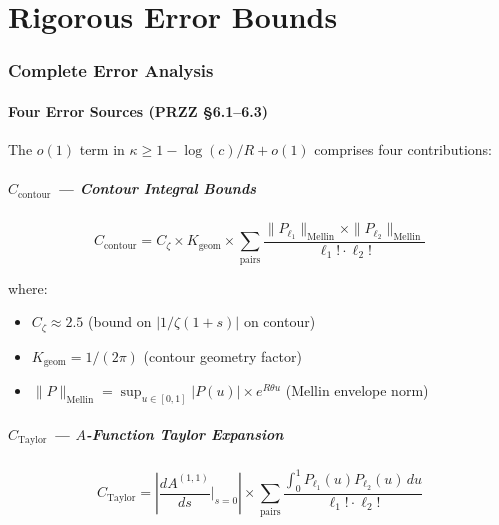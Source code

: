 \documentclass[11pt]{article}
\begin{document}

\part{Rigorous Error Bounds}

\section{Complete Error Analysis}
\label{sec:error}

\subsection{Four Error Sources (PRZZ \S6.1--6.3)}

The $o(1)$ term in $\kappa \geq 1 - \log(c)/R + o(1)$ comprises four contributions:

\subsubsection{$C_{\text{contour}}$ --- Contour Integral Bounds}

\begin{equation}
C_{\text{contour}} = C_\zeta \times K_{\text{geom}} \times \sum_{\text{pairs}} \frac{\|P_{\ell_1}\|_{\text{Mellin}} \times \|P_{\ell_2}\|_{\text{Mellin}}}{\ell_1! \cdot \ell_2!}
\end{equation}

where:
\begin{itemize}
\item $C_\zeta \approx 2.5$ (bound on $|1/\zeta(1+s)|$ on contour)
\item $K_{\text{geom}} = 1/(2\pi)$ (contour geometry factor)
\item $\|P\|_{\text{Mellin}} = \sup_{u \in [0,1]} |P(u)| \times e^{R\theta u}$ (Mellin envelope norm)
\end{itemize}

\subsubsection{$C_{\text{Taylor}}$ --- $A$-Function Taylor Expansion}

\begin{equation}
C_{\text{Taylor}} = \left|\frac{dA^{(1,1)}}{ds}\Big|_{s=0}\right| \times \sum_{\text{pairs}} \frac{\int_0^1 P_{\ell_1}(u) P_{\ell_2}(u) \, du}{\ell_1! \cdot \ell_2!}
\end{equation}
\end{document}
